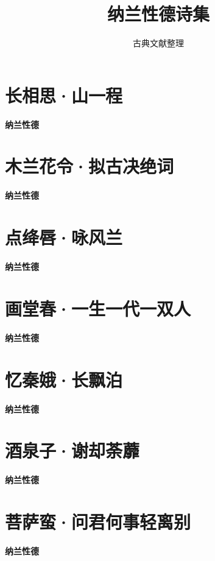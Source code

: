 \documentclass[12pt,a4paper]{ctexbook}
\title{纳兰性德诗集}
\author{古典文献整理}
\date{}
\begin{document}
\maketitle
\tableofcontents
\newpage
\section{长相思·山一程}
\textbf{纳兰性德}\par\vspace{0.5em}

\section{木兰花令·拟古决绝词}
\textbf{纳兰性德}\par\vspace{0.5em}

\section{点绛唇·咏风兰}
\textbf{纳兰性德}\par\vspace{0.5em}

\section{画堂春·一生一代一双人}
\textbf{纳兰性德}\par\vspace{0.5em}

\section{忆秦娥·长飘泊}
\textbf{纳兰性德}\par\vspace{0.5em}

\section{酒泉子·谢却荼蘼}
\textbf{纳兰性德}\par\vspace{0.5em}

\section{菩萨蛮·问君何事轻离别}
\textbf{纳兰性德}\par\vspace{0.5em}
\end{document}
